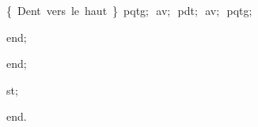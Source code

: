 {\vspace{\neglskip}\mbox{\blc  \blk\blk\blk\blk\blk\idt  \cmt  \{\ Dent\ vers\ le\ haut\ \}\idt \ pqtg$;$\ av$;$\ pdt$;$\ av$;$\ pqtg$;$\ }\par 
\vspace{\neglskip}\mbox{\blc  \blk\blk\blk\blk\idt  \mcl end\idt $;$}\par 
\vspace{\neglskip}\mbox{\blc  \blk\blk\idt  \mcl end\idt $;$}\par 
\vspace{\neglskip}\mbox{\blc  \blk\idt  st$;$\ }\par 
\vspace{\neglskip}\mbox{\blc  \idt  \mcl end\idt $.$}\par 

\medskip }

